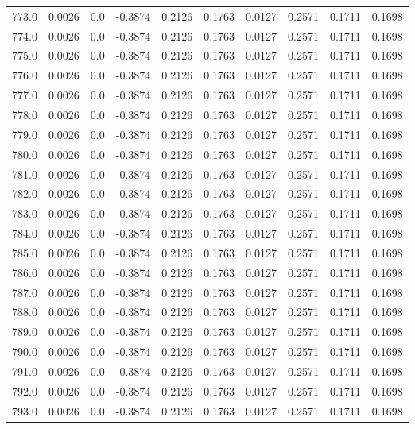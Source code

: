 \begin{longtable}{lrrrrrrrrr}
773.0 & 0.0026 & 0.0 & -0.3874 & 0.2126 & 0.1763 & 0.0127 & 0.2571 & 0.1711 & 0.1698 \\
774.0 & 0.0026 & 0.0 & -0.3874 & 0.2126 & 0.1763 & 0.0127 & 0.2571 & 0.1711 & 0.1698 \\
775.0 & 0.0026 & 0.0 & -0.3874 & 0.2126 & 0.1763 & 0.0127 & 0.2571 & 0.1711 & 0.1698 \\
776.0 & 0.0026 & 0.0 & -0.3874 & 0.2126 & 0.1763 & 0.0127 & 0.2571 & 0.1711 & 0.1698 \\
777.0 & 0.0026 & 0.0 & -0.3874 & 0.2126 & 0.1763 & 0.0127 & 0.2571 & 0.1711 & 0.1698 \\
778.0 & 0.0026 & 0.0 & -0.3874 & 0.2126 & 0.1763 & 0.0127 & 0.2571 & 0.1711 & 0.1698 \\
779.0 & 0.0026 & 0.0 & -0.3874 & 0.2126 & 0.1763 & 0.0127 & 0.2571 & 0.1711 & 0.1698 \\
780.0 & 0.0026 & 0.0 & -0.3874 & 0.2126 & 0.1763 & 0.0127 & 0.2571 & 0.1711 & 0.1698 \\
781.0 & 0.0026 & 0.0 & -0.3874 & 0.2126 & 0.1763 & 0.0127 & 0.2571 & 0.1711 & 0.1698 \\
782.0 & 0.0026 & 0.0 & -0.3874 & 0.2126 & 0.1763 & 0.0127 & 0.2571 & 0.1711 & 0.1698 \\
783.0 & 0.0026 & 0.0 & -0.3874 & 0.2126 & 0.1763 & 0.0127 & 0.2571 & 0.1711 & 0.1698 \\
784.0 & 0.0026 & 0.0 & -0.3874 & 0.2126 & 0.1763 & 0.0127 & 0.2571 & 0.1711 & 0.1698 \\
785.0 & 0.0026 & 0.0 & -0.3874 & 0.2126 & 0.1763 & 0.0127 & 0.2571 & 0.1711 & 0.1698 \\
786.0 & 0.0026 & 0.0 & -0.3874 & 0.2126 & 0.1763 & 0.0127 & 0.2571 & 0.1711 & 0.1698 \\
787.0 & 0.0026 & 0.0 & -0.3874 & 0.2126 & 0.1763 & 0.0127 & 0.2571 & 0.1711 & 0.1698 \\
788.0 & 0.0026 & 0.0 & -0.3874 & 0.2126 & 0.1763 & 0.0127 & 0.2571 & 0.1711 & 0.1698 \\
789.0 & 0.0026 & 0.0 & -0.3874 & 0.2126 & 0.1763 & 0.0127 & 0.2571 & 0.1711 & 0.1698 \\
790.0 & 0.0026 & 0.0 & -0.3874 & 0.2126 & 0.1763 & 0.0127 & 0.2571 & 0.1711 & 0.1698 \\
791.0 & 0.0026 & 0.0 & -0.3874 & 0.2126 & 0.1763 & 0.0127 & 0.2571 & 0.1711 & 0.1698 \\
792.0 & 0.0026 & 0.0 & -0.3874 & 0.2126 & 0.1763 & 0.0127 & 0.2571 & 0.1711 & 0.1698 \\
793.0 & 0.0026 & 0.0 & -0.3874 & 0.2126 & 0.1763 & 0.0127 & 0.2571 & 0.1711 & 0.1698 \\

\end{longtable}
